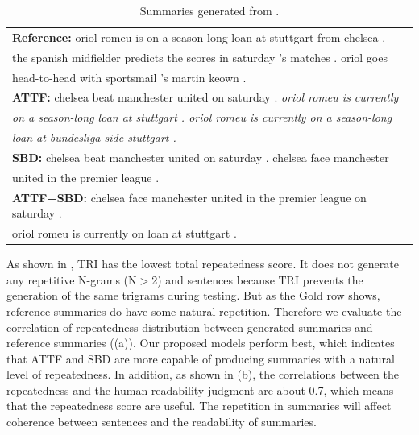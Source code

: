 \begin{table}[th!]
\begin{center}
\caption{Summaries generated from .}
\begin{tabular}{|l|}%
\hline \textbf{Reference:} oriol romeu is on a season-long loan at stuttgart from chelsea . \\
       the spanish midfielder predicts the scores in saturday 's matches . oriol goes \\
	   head-to-head with sportsmail 's martin keown .\\
\hline \textbf{ATTF:} chelsea beat manchester united on saturday . \textit{oriol romeu is currently} \\
       \textit{on a season-long loan at stuttgart . oriol romeu is currently on a season-long} \\
	   \textit{loan at bundesliga side stuttgart .}\\
\hline \textbf{SBD:} chelsea beat manchester united on saturday . chelsea face manchester \\
       united in the premier league . \\ 
\hline \textbf{ATTF+SBD:} chelsea face manchester united in the premier league on saturday . \\
       oriol romeu is currently on loan at stuttgart . \\
\hline
\end{tabular}
\end{center}
\label{tab:src_rep}
\end{table}

As shown in , TRI has the lowest total repeatedness score.
It does not generate any repetitive N-grams (N$>$2) and sentences 
because TRI prevents the generation of the same trigrams during testing.
But as the Gold row shows, reference summaries do have some natural repetition.
Therefore we evaluate the correlation of repeatedness distribution between
generated summaries and reference summaries ((a)).
Our proposed models perform best,
which indicates that ATTF and SBD are more capable of producing summaries with a natural level of repeatedness.
In addition, as shown in (b), the correlations between the repeatedness and the human readability judgment are about 0.7, which means that the repeatedness score are useful. The repetition in summaries will affect coherence between sentences and the readability of summaries.

